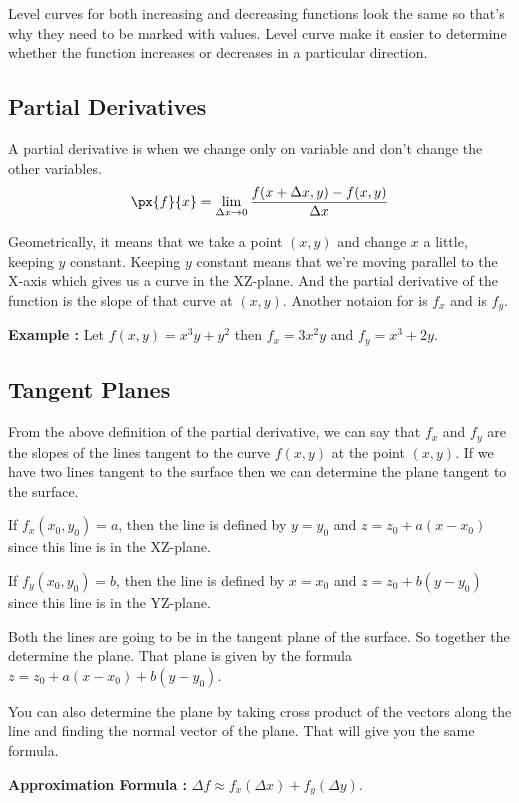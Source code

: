 Level curves for both increasing and decreasing functions look the same so that's why they need to be marked with values.
Level curve make it easier to determine whether the function increases or decreases in a particular direction.


\subsection{Partial Derivatives}

A partial derivative is when we change only on variable and don't change the other variables.
$$ \px{f}{x} = \lim_{\Delta x \to 0} \frac{f(x+\Delta x, y) - f(x, y)}{\Delta x} $$

Geometrically, it means that we take a point $(x, y)$ and change $x$ a little, keeping $y$ constant.
Keeping $y$ constant means that we're moving parallel to the X-axis which gives us a curve in the XZ-plane.
And the partial derivative of the function is the slope of that curve at $(x, y)$.
Another notaion for  is $f_x$ and  is $f_y$.


{\bf Example : } Let $f(x, y) = x^3 y  + y^2$ then $f_x = 3x^2y$ and $f_y = x^3 + 2y$.

\subsection{Tangent Planes}

From the above definition of the partial derivative, we can say that $f_x$ and $f_y$ are the slopes of the lines tangent to the curve $f(x, y)$ at the point $(x ,y)$.
If we have two lines tangent to the surface then we can determine the plane tangent to the surface.

If $f_x(x_0, y_0) = a$, then the line is defined by $y = y_0$ and $z = z_0 + a(x-x_0)$ since this line is in the XZ-plane.

If $f_y(x_0, y_0) = b$, then the line is defined by $x = x_0$ and $z = z_0 + b(y-y_0)$ since this line is in the YZ-plane.

Both the lines are going to be in the tangent plane of the surface. So together the determine the plane. 
That plane is given by the formula $z = z_0 + a(x-x_0) + b(y-y_0)$.

You can also determine the plane by taking cross product of the vectors along the line and finding the normal vector of the plane. 
That will give you the same formula.


{\bf Approximation Formula : } $\Delta f \approx f_x (\Delta x) + f_y (\Delta y)$.